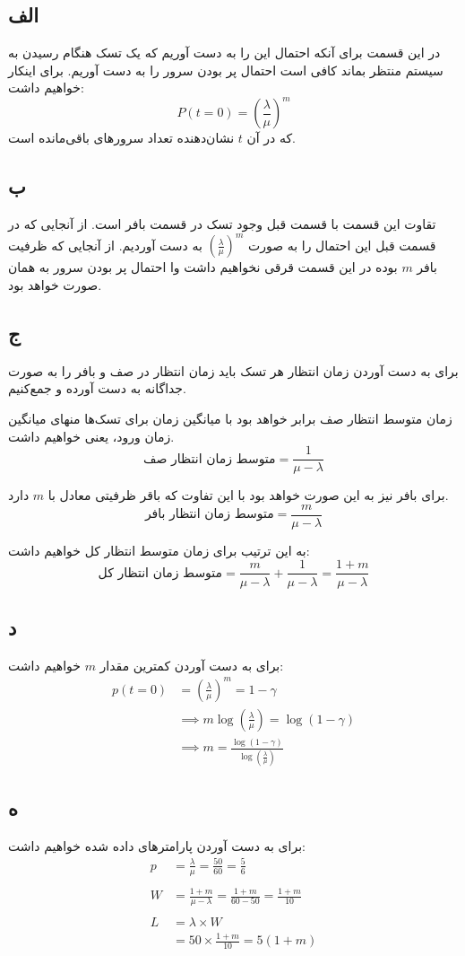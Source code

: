 \subsection*{الف}
در این قسمت برای آنکه احتمال این را به دست آوریم که یک تسک هنگام رسیدن به سیستم منتظر بماند کافی است احتمال پر بودن سرور را به دست آوریم. برای اینکار خواهیم داشت:
\[
P(t = 0) = (\frac{\lambda}{\mu})^m
\]
که در آن
$t$
نشان‌دهنده تعداد سرورهای باقی‌مانده است.

\subsection*{ب}
تقاوت این قسمت با قسمت قبل وجود تسک در قسمت بافر است. از آنجایی که در قسمت قبل این احتمال را به صورت
$(\frac{\lambda}{\mu})^m$
به دست آوردیم. از آنجایی که ظرفیت بافر
$m$
بوده در این قسمت قرقی نخواهیم داشت وا احتمال پر بودن سرور به همان صورت خواهد بود.

\subsection*{ج}
برای به دست آوردن زمان انتظار هر تسک باید زمان انتظار در صف و بافر را به صورت جداگانه به دست آورده و جمع‌کنیم.

زمان متوسط انتظار صف برابر خواهد بود با میانگین زمان برای تسک‌ها منهای میانگین زمان ورود، یعنی خواهیم داشت.
\[
\text{متوسط زمان انتظار صف} = \frac{1}{\mu - \lambda}
\]

برای بافر نیز به این صورت خواهد بود با این تفاوت که باقر ظرفیتی معادل با
$m$
دارد.
\[
\text{متوسط زمان انتظار بافر} = \frac{m}{\mu - \lambda}
\]

به این ترتیب برای زمان متوسط انتظار کل خواهیم داشت:
\[
\text{متوسط زمان انتظار کل} = \frac{m}{\mu - \lambda} + \frac{1}{\mu - \lambda} = \frac{1 + m}{\mu - \lambda}
\]

\subsection*{د}
برای به دست آوردن کمترین مقدار
$m$
خواهیم داشت:
\begin{align*}
    p(t = 0) &= (\frac{\lambda}{\mu})^m = 1 - \gamma \\
    &\implies m \log(\frac{\lambda}{\mu}) = \log(1 - \gamma) \\
    &\implies m = \frac{\log(1 - \gamma)}{\log(\frac{\lambda}{\mu})}
\end{align*}

\subsection*{ه}
برای به دست آوردن پارامترهای داده شده خواهیم داشت:
\begin{align*}
    p &= \frac{\lambda}{\mu} = \frac{50}{60} = \frac{5}{6} \\\\
    W &= \frac{1 + m}{\mu - \lambda} = \frac{1 + m}{60 - 50} = \frac{1 + m}{10} \\\\
    L &= \lambda \times W \\
    &= 50 \times \frac{1 + m}{10} = 5(1 + m)
\end{align*}